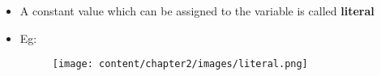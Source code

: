 
\begin{flushleft}


	\begin{itemize}
		\item A constant value which can be assigned to the variable is called \textbf{literal}
		\item Eg:
		\begin{figure}[h!]
			\centering
			\texttt{[image: content/chapter2/images/literal.png]}
		\end{figure}		
		
	\end{itemize}


	
\end{flushleft}



